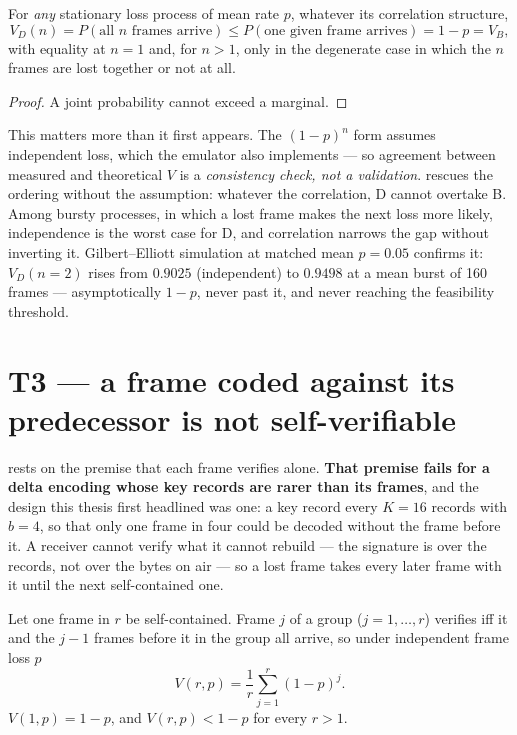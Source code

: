 \begin{theorem}\label{thm:t3c}
For \emph{any} stationary loss process of mean rate $p$, whatever its correlation structure,
\[
V_D(n) = P(\text{all } n \text{ frames arrive}) \leq P(\text{one given frame arrives}) = 1-p = V_B,
\]
with equality at $n = 1$ and, for $n > 1$, only in the degenerate case in which the $n$ frames
are lost together or not at all.
\end{theorem}

\begin{proof}
A joint probability cannot exceed a marginal.
\end{proof}

This matters more than it first appears. The $(1-p)^n$ form assumes independent loss, which the
emulator also implements --- so agreement between measured and theoretical $V$ is a
\emph{consistency check, not a validation}.  rescues the ordering without the
assumption: whatever the correlation, D cannot overtake B. Among bursty processes, in which a
lost frame makes the next loss more likely, independence is the worst case for D, and
correlation narrows the gap without inverting it. Gilbert--Elliott simulation at matched mean $p = 0.05$ confirms it: $V_D(n{=}2)$ rises
from $0.9025$ (independent) to $0.9498$ at a mean burst of 160 frames --- asymptotically $1-p$,
never past it, and never reaching the feasibility threshold.

\section{T3\textquotesingle{} --- a frame coded against its predecessor is not self-verifiable}

 rests on the premise that each frame verifies alone. \textbf{That premise fails
for a delta encoding whose key records are rarer than its frames}, and the design this thesis first
headlined was one: a key record every $K = 16$ records with $b = 4$, so that only one frame in four
could be decoded without the frame before it. A receiver cannot verify what it cannot rebuild ---
the signature is over the records, not over the bytes on air --- so a lost frame takes every later
frame with it until the next self-contained one.

\begin{theorem}\label{thm:t3prime}
Let one frame in $r$ be self-contained. Frame $j$ of a group ($j = 1, \dots, r$) verifies iff it
and the $j-1$ frames before it in the group all arrive, so under independent frame loss $p$
\[
V(r, p) = \frac{1}{r} \sum_{j=1}^{r} (1-p)^j .
\]
$V(1, p) = 1 - p$, and $V(r, p) < 1 - p$ for every $r > 1$.
\end{theorem}

